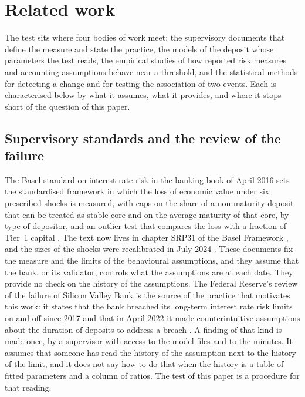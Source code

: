 \section{Related work}
\label{sec:related-work}

The test sits where four bodies of work meet: the supervisory documents that define the measure and state the practice, the models of the deposit whose parameters the test reads, the empirical studies of how reported risk measures and accounting assumptions behave near a threshold, and the statistical methods for detecting a change and for testing the association of two events. Each is characterised below by what it assumes, what it provides, and where it stops short of the question of this paper.

\subsection{Supervisory standards and the review of the failure}
\label{sec:rw-supervisory}

The Basel standard on interest rate risk in the banking book of April 2016 sets the standardised framework in which the loss of economic value under six prescribed shocks is measured, with caps on the share of a non-maturity deposit that can be treated as stable core and on the average maturity of that core, by type of depositor, and an outlier test that compares the loss with a fraction of Tier~1 capital \citep{bcbs2016}. The text now lives in chapter SRP31 of the Basel Framework \citep{basel2019srp31}, and the sizes of the shocks were recalibrated in July 2024 \citep{bcbs2024}. These documents fix the measure and the limits of the behavioural assumptions, and they assume that the bank, or its validator, controls what the assumptions are at each date. They provide no check on the history of the assumptions. The Federal Reserve's review of the failure of Silicon Valley Bank is the source of the practice that motivates this work: it states that the bank breached its long-term interest rate risk limits on and off since 2017 and that in April 2022 it made counterintuitive assumptions about the duration of deposits to address a breach \citep{fed2023}. A finding of that kind is made once, by a supervisor with access to the model files and to the minutes. It assumes that someone has read the history of the assumption next to the history of the limit, and it does not say how to do that when the history is a table of fitted parameters and a column of ratios. The test of this paper is a procedure for that reading.

